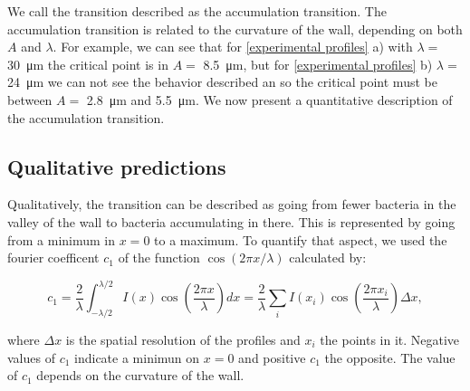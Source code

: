 We call the transition  described as the accumulation transition. The accumulation transition is related to the curvature of the wall, depending on both $A$ and $\lambda$. For example, we can see that for \ref{experimental profiles} a) with $\lambda= $ \SI{30}{\micro\meter} the  critical point is in $A=$ \SI{8.5}{\micro\meter}, but for \ref{experimental profiles} b) $\lambda=$ \SI{24}{\micro\meter} we can not see the behavior described an so the critical point must be between $A=$ \SI{2.8}{\micro\meter} and \SI{5.5}{\micro\meter}. We now present a quantitative description of the accumulation transition.


\subsection{Qualitative predictions}

Qualitatively, the transition can be described as going from fewer bacteria in the valley of the wall to bacteria accumulating in there. This is represented by going from a minimum in $x=0$ to a maximum. To quantify that aspect, we used the fourier coefficent $c_1$ of the function $\cos{(2\pi x/\lambda)}$ calculated by:

\begin{equation}
    c_1 = \frac{2}{\lambda}\int_{-\lambda/2}^{\lambda/2} I(x)\cos\left(\frac{2\pi x}{\lambda} \right)dx = \frac{2}{\lambda} \sum_i I(x_i) \cos\left(\frac{2\pi x_i}{\lambda} \right)\Delta x,
\end{equation}

where $\Delta x$ is the spatial resolution of the profiles and $x_i$ the points in it. Negative values of $c_1$ indicate a minimun on $x=0$ and positive $c_1$ the opposite. The value of $c_1$ depends on the curvature of the wall. 




